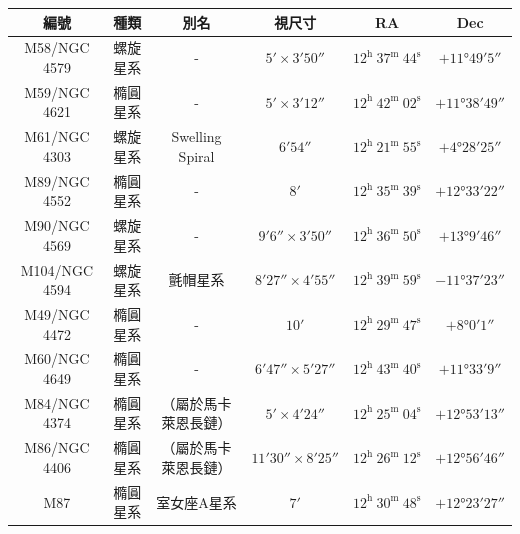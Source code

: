 \begin{center}
\begin{longtable}{c | c | c | c | c | c}
    編號 & 種類 & 別名 & 視尺寸 & RA & Dec \\
    \hline
    \endfirsthead


    \endfoot

    \endlastfoot

    M58/NGC 4579 & 螺旋星系 & - & \(\ang{;5;}\times\ang{;3;50}\) & \(12^\text{h }37^\text{m }44^\text{s}\) & \(+\ang{11;49;5}\) \\
    M59/NGC 4621 & 橢圓星系 & - & \(\ang{;5;}\times\ang{;3;12}\) & \(12^\text{h }42^\text{m }02^\text{s}\) & \(+\ang{11;38;49}\) \\
    M61/NGC 4303 & 螺旋星系 & Swelling Spiral & \(\ang{;6;54}\) & \(12^\text{h }21^\text{m }55^\text{s}\) & \(+\ang{4;28;25}\) \\
    M89/NGC 4552 & 橢圓星系 & - & \(\ang{;8;}\) & \(12^\text{h }35^\text{m }39^\text{s}\) & \(+\ang{12;33;22}\) \\
    M90/NGC 4569 & 螺旋星系 & - & \(\ang{;9;6}\times\ang{;3;50}\) & \(12^\text{h }36^\text{m }50^\text{s}\) & \(+\ang{13;9;46}\) \\
    M104/NGC 4594 & 螺旋星系 & 氈帽星系 & \(\ang{;8;27}\times\ang{;4;55}\) & \(12^\text{h }39^\text{m }59^\text{s}\) & \(-\ang{11;37;23}\) \\
    M49/NGC 4472 & 橢圓星系 & - & \(\ang{;10;}\) & \(12^\text{h }29^\text{m }47^\text{s}\) & \(+\ang{8;0;1}\) \\
    M60/NGC 4649 & 橢圓星系 & - & \(\ang{;6;47}\times\ang{;5;27}\) & \(12^\text{h }43^\text{m }40^\text{s}\) & \(+\ang{11;33;9}\) \\
    M84/NGC 4374 & 橢圓星系 & （屬於馬卡萊恩長鏈） & \(\ang{;5;}\times\ang{;4;24}\) & \(12^\text{h }25^\text{m }04^\text{s}\) & \(+\ang{12;53;13}\) \\
    M86/NGC 4406 & 橢圓星系 & （屬於馬卡萊恩長鏈） & \(\ang{;11;30}\times\ang{;8;25}\) & \(12^\text{h }26^\text{m }12^\text{s}\) & \(+\ang{12;56;46}\) \\
    M87 & 橢圓星系 & 室女座A星系 & \(\ang{;7;}\) & \(12^\text{h }30^\text{m }48^\text{s}\) & \(+\ang{12;23;27}\)
\end{longtable}
\end{center}


